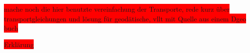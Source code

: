 \documentclass[bibliography=totoc,12pt,a4paper]{scrartcl}
\theoremstyle{exampstyle}
\numberwithin{equation}{section}
\begin{document}
\colorbox{red}{mache noch die hier benutzte vereinfachung der Transporte, rede kurz über transportgleichungen und lösung für geodätische, vllt mit Quelle aus einem Dgeo buch}


\colorbox{red}{Erklärung}


\newpage
\nocite{*}


\end{document}
